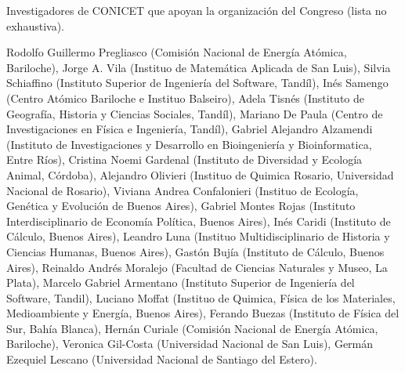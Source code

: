 \documentclass[a4paper,11pt]{article}
\begin{document}
 \vspace{1cm}

Investigadores de CONICET que apoyan la organización del Congreso (lista no exhaustiva).

\vspace{0.3cm}


  \scriptsize
 \noindent  Rodolfo Guillermo Pregliasco (Comisión Nacional de Energía Atómica, Bariloche), Jorge A. Vila (Instituo de Matemática Aplicada de San Luis), Silvia Schiaffino (Instituto Superior de Ingeniería del Software, Tandíl), Inés Samengo (Centro Atómico Bariloche e Instituo Balseiro), Adela Tisnés (Instituto de Geografía, Historia y Ciencias Sociales, Tandíl), Mariano De Paula (Centro de Investigaciones en Física e Ingeniería, Tandíl), Gabriel Alejandro Alzamendi (Instituto de Investigaciones y Desarrollo en Bioingeniería y Bioinformatica, Entre Ríos), Cristina Noemi Gardenal (Instituto de Diversidad y Ecología Animal, Córdoba), Alejandro Olivieri (Instituo de Quimica Rosario, Universidad Nacional de Rosario), Viviana Andrea Confalonieri (Instituo de Ecología, Genética y Evolución de Buenos Aires), Gabriel Montes Rojas (Instituto Interdisciplinario de Economía Política, Buenos Aires), Inés Caridi (Instituto de Cálculo, Buenos Aires), Leandro Luna (Instituo Multidisciplinario de Historia y Ciencias Humanas, Buenos Aires), Gastón Bujía (Instituto de Cálculo, Buenos Aires), Reinaldo Andrés	Moralejo (Facultad de Ciencias Naturales y Museo, La Plata), Marcelo Gabriel	Armentano (Instituto Superior de Ingeniería del Software, Tandil), Luciano Moffat (Instituo de Quimica, Física de los Materiales, Medioambiente y Energía, Buenos Aires), Ferando Buezas (Instituto de Física del Sur, Bahía Blanca), Hernán Curiale (Comisión Nacional de Energía Atómica, Bariloche), Veronica Gil-Costa (Universidad Nacional de San Luis), Germán Ezequiel Lescano (Universidad Nacional de Santiago del Estero).
\end{document}
